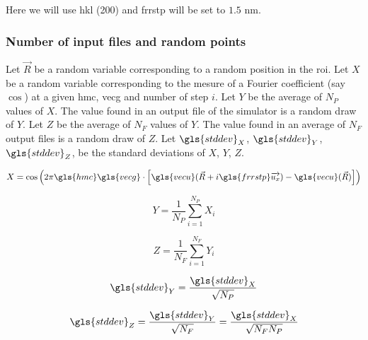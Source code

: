\medskip

{\renewcommand{\arraystretch}{1.6}




\bigskip

Here we will use hkl (200) and \gls{frrstp} will be set to \( 1.5 \) nm.

\subsubsection{Number of input files and random points}

Let \( \vec{R} \) be a random variable corresponding to a random position in the \gls{roi}.
Let \( X \) be a random variable corresponding to the mesure of a Fourier coefficient (say \( \cos \)) at a given \gls{hmc}, \gls{vecg} and number of step \( i \).
Let \( Y \) be the average of \( N_P \) values of \( X \).
The value found in an output file of the simulator is a random draw of \( Y \).
Let \( Z \) be the average of \( N_F \) values of \( Y \).
The value found in an average of \( N_F \) output files is a random draw of \( Z \).
Let \( \gls{stddev}_X \), \( \gls{stddev}_Y \), \( \gls{stddev}_Z \), be the standard deviations of \( X \), \( Y \), \( Z \).

\begin{equation}
X
= \cos \left( 2 \pi \gls{hmc} \gls{vecg} \cdot \left[ \gls{vecu}( \vec{R} + i \gls{frrstp} \overrightarrow{u_x}) - \gls{vecu}(\vec{R}) \right] \right)
\end{equation}

\bigskip

\begin{equation}
Y
= \frac{1}{N_P} \sum_{i=1}^{N_P} X_i
\end{equation}

\bigskip

\begin{equation}
Z
= \frac{1}{N_F} \sum_{i=1}^{N_F} Y_i
\end{equation}

\bigskip

\begin{equation}
\gls{stddev}_Y
= \frac{\gls{stddev}_X}{\sqrt{N_P}}
\end{equation}

\bigskip

\begin{equation}\label{eq:fourier-error}
\gls{stddev}_Z
= \frac{\gls{stddev}_Y}{\sqrt{N_F}}
= \frac{\gls{stddev}_X}{\sqrt{N_F N_P}}
\end{equation}

}
